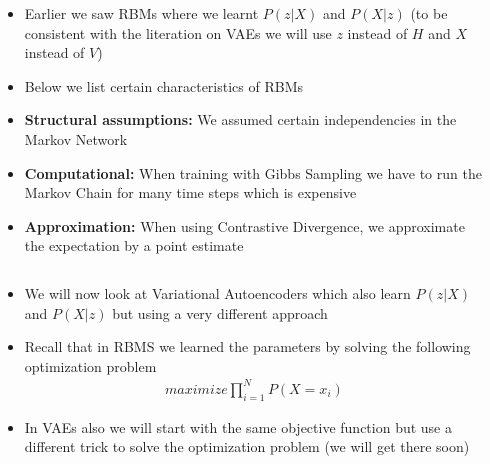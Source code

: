 \begin{frame}
	\begin{columns}
		\begin{overlayarea}{\textwidth}{\textheight}
						
		\end{overlayarea}
		\begin{overlayarea}{\textwidth}{\textheight}
			\begin{itemize}\justifying
				\item<1-> Earlier we saw RBMs where we learnt $P(z|X)$ and $P(X|z)$ (to be consistent with the literation on VAEs we will use $z$ instead of $H$ and $X$ instead of $V$) 
				\item<2-> Below we list certain characteristics of RBMs
				\item<3-> \textbf{Structural assumptions:} We assumed certain independencies in the Markov Network
				\item<4-> \textbf{Computational:} When training with Gibbs Sampling we have to run the Markov Chain for many time steps which is expensive 
				\item<5-> \textbf{Approximation:} When using Contrastive Divergence, we approximate the expectation by a point estimate
			\end{itemize}
		\end{overlayarea}
	\end{columns}
\end{frame}


\begin{frame}
	\begin{columns}
		\column{0.4\textwidth}
		\begin{overlayarea}{\textwidth}{\textheight}
			\vspace{3pt}
			
		\end{overlayarea}
		\column{0.6\textwidth}
		\begin{overlayarea}{\textwidth}{\textheight}
			\begin{itemize}\justifying
				\item<1-> We will now look at Variational Autoencoders which also learn $P(z|X)$ and $P(X|z)$ but using a very different approach
				\item<2-> Recall that in RBMS we learned the parameters by solving the following optimization problem
				\begin{align*}
					maximize \prod_{i=1}^{N} P(X = x_i)
				\end{align*}
				\item<3-> In VAEs also we will start with the same objective function but use a different trick to solve the optimization problem (we will get there soon)
			\end{itemize}
		\end{overlayarea}
	\end{columns}
\end{frame}


